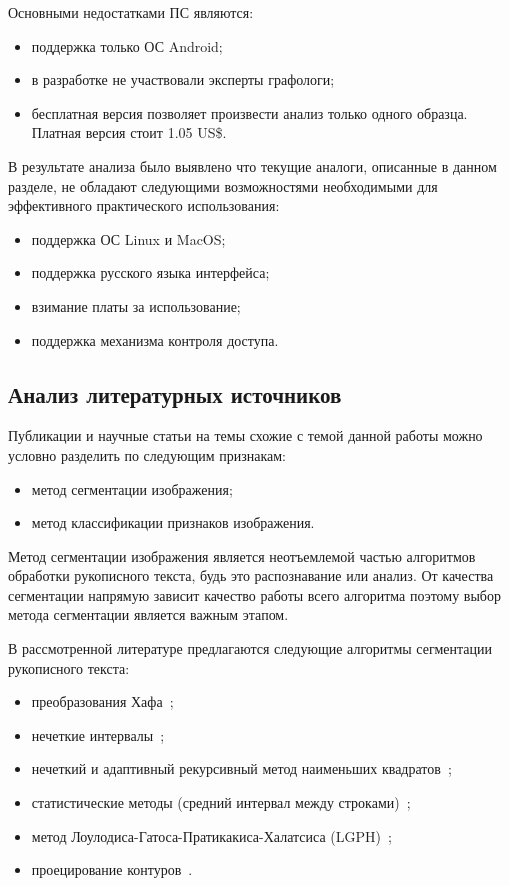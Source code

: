 Основными недостатками ПС являются:
\begin{itemize}
  \item поддержка только ОС Android;
  \item в разработке не участвовали эксперты графологи;
  \item бесплатная версия позволяет произвести анализ только одного образца. Платная версия стоит 1.05 US\$.
\end{itemize}

В результате анализа было выявлено что текущие аналоги, описанные в данном разделе, не обладают следующими возможностями необходимыми для эффективного практического использования:
\begin{itemize}
  \item поддержка ОС Linux и MacOS;
  \item поддержка русского языка интерфейса;
  \item взимание платы за использование;
  \item поддержка механизма контроля доступа.
\end{itemize}

\subsection{Анализ литературных источников}
\label{sub:domain:literary_sources}

Публикации и научные статьи на темы схожие с темой данной работы можно условно разделить по следующим признакам:
\begin{itemize}
  \item метод сегментации изображения;
  \item метод классификации признаков изображения.
\end{itemize}

Метод сегментации изображения является неотъемлемой частью алгоритмов обработки рукописного текста, будь это распознавание или анализ. От качества сегментации напрямую зависит качество работы всего алгоритма поэтому выбор метода сегментации является важным этапом.

В рассмотренной литературе предлагаются следующие алгоритмы сегментации рукописного текста:
\begin{itemize}
  \item преобразования Хафа~\cite{louloudis_gatos_pratikakis_halatsis};
  \item нечеткие интервалы~\cite{louloudis_gatos_pratikakis_halatsis};
  \item нечеткий и адаптивный рекурсивный метод наименьших квадратов~\cite{louloudis_gatos_pratikakis_halatsis};
  \item статистические методы (средний интервал между строками)~\cite{gomathi_umadevi_mohanavel};
  \item метод Лоулодиса-Гатоса-Пратикакиса-Халатсиса (LGPH)~\cite{louloudis_gatos_pratikakis_halatsis};
  \item проецирование контуров~\cite{louloudis_gatos_pratikakis_halatsis}.
\end{itemize}


